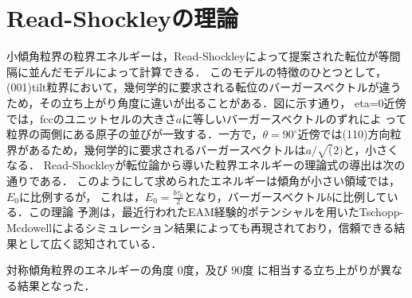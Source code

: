 
\section{Read-Shockleyの理論}
小傾角粒界の粒界エネルギーは，Read-Shockleyによって提案された転位が等間隔に並んだモデルによって計算できる．
このモデルの特徴のひとつとして，(001)tilt粒界において，幾何学的に要求される転位のバーガースベクトルが違うため，その立ち上がり角度に違いが出ることがある．図に示す通り，
eta=0近傍では，fccのユニットセルの大きさ$a$に等しいバーガースベクトルのずれによ
って粒界の両側にある原子の並びが一致する．一方で，$\theta=90^\circ$近傍では(110)方向粒界があるため，幾何学的に要求されるバーガースベクトルは$a/\sqrt(2)$と，小さくなる．
Read-Shockleyが転位論から導いた粒界エネルギーの理論式の導出は次の通りである．
このようにして求められたエネルギーは傾角が小さい領域では，$E_0$に比例するが，
これは，$E_0=\frac{b \tau_0}{2}$となり，バーガースベクトル$b$に比例している．この理論
予測は，最近行われたEAM経験的ポテンシャルを用いたTschopp-Mcdowellによるシミュレーション結果によっても再現されており，信頼できる結果として広く認知されている．

対称傾角粒界のエネルギーの角度 0度，及び 90度 に相当する立ち上がりが異なる結果となった．

